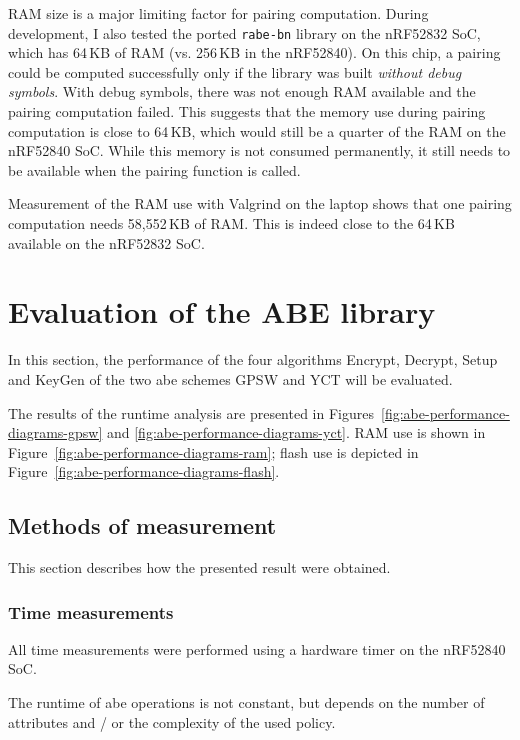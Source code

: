 RAM size is a major limiting factor for pairing computation.
During development, I also tested the ported \texttt{rabe-bn} library on the nRF52832 SoC, which has 64\,KB of RAM (vs. 256\,KB in the nRF52840). 
On this chip, a pairing could be computed successfully only if the library was built \emph{without debug symbols}.
With debug symbols, there was not enough RAM available and the pairing computation failed.
This suggests that the memory use during pairing computation is close to 64\,KB, which would still be a quarter of the RAM on the nRF52840 SoC.
While this memory is not consumed permanently, it still needs to be available when the pairing function is called.

Measurement of the RAM use with Valgrind on the laptop shows that one pairing computation needs 58,552\,KB of RAM.
This is indeed close to the 64\,KB available on the nRF52832 SoC.

\section{Evaluation of the ABE library}\label{sec:abe-performance}

In this section, the performance of the four algorithms Encrypt, Decrypt, Setup and KeyGen of the two \acrshort{abe} schemes GPSW and YCT will be evaluated.

The results of the runtime analysis are presented in Figures~\ref{fig:abe-performance-diagrams-gpsw} and \ref{fig:abe-performance-diagrams-yct}. 
RAM use is shown in Figure~\ref{fig:abe-performance-diagrams-ram}; flash use is depicted in Figure~\ref{fig:abe-performance-diagrams-flash}. 


\subsection{Methods of measurement}
This section describes how the presented result were obtained.

\subsubsection{Time measurements}


All time measurements were performed using a hardware timer on the nRF52840 SoC.

The runtime of \acrshort{abe} operations is not constant, but depends on the number of attributes and / or the complexity of the used policy.

